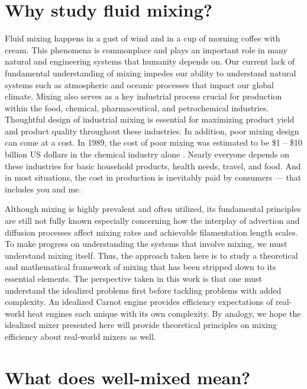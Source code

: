 


	
\section{Why study fluid mixing?}			
		
Fluid mixing happens in a gust of wind and in a cup of morning coffee with cream. This phenomena is commonplace and plays an important role in many natural and engineering systems that humanity depends on. Our current lack of fundamental understanding of mixing impedes our ability to understand natural systems such as atmospheric and oceanic processes that impact our global climate. Mixing also serves as a key industrial process crucial for production within the food, chemical, pharmaceutical, and petrochemical industries. Thoughtful design of industrial mixing is essential for maximizing product yield and product quality throughout these industries. In addition, poor mixing design can come at a cost. In 1989, the cost of poor mixing was estimated to be \$1 -- \$10 billion US dollars in the chemical industry alone \cite{paul2004handbook}. Nearly everyone depends on these industries for basic household products, health needs, travel, and food. And in most situations, the cost in production is inevitably paid by consumers --- that includes you and me. 


Although mixing is highly prevalent and often utilized, its fundamental principles are still not fully known especially concerning how the interplay of advection and diffusion processes affect mixing rates and achievable filamentation length scales. To make progress on understanding the systems that involve mixing, we must understand mixing itself. Thus, the approach taken here is to study a theoretical and mathematical framework of mixing that has been stripped down to its essential elements. The perspective taken in this work is that one must understand the idealized problems first before tackling problems with added complexity. An idealized Carnot engine provides efficiency expectations of real-world heat engines each unique with its own complexity. By analogy,  we hope the idealized mixer presented here will provide theoretical principles on mixing efficiency about real-world mixers as well.


\section{What does well-mixed mean?}

